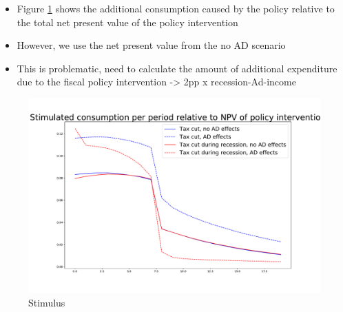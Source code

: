 \documentclass[]{article}
\begin{document}
\begin{itemize}
	\item Figure \ref{fig:stimulus} shows the additional consumption caused by the policy relative to the total net present value of the policy intervention
	\item However, we use the net present value from the no AD scenario
	\item This is problematic, need to calculate the amount of additional expenditure due to the fiscal policy intervention -> 2pp x recession-Ad-income
\end{itemize}

\begin{figure} 
	\begin{centering}
		\includegraphics[width=\linewidth]{../stimulated-consumption.pdf}
		\caption{Stimulus}
		\label{fig:stimulus}
	\end{centering}
\end{figure}
\end{document}
